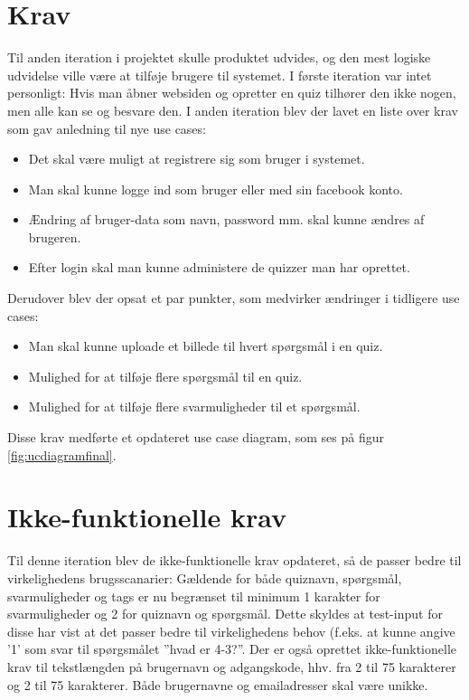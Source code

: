 \section{Krav}
Til anden iteration i projektet skulle produktet udvides, og den mest logiske udvidelse ville være at tilføje brugere til systemet. I første iteration var intet personligt: Hvis man åbner websiden og opretter en quiz tilhører den ikke nogen, men alle kan se og besvare den.
I anden iteration blev der lavet en liste over krav som gav anledning til nye use cases:
\begin{itemize}
\item Det skal være muligt at registrere sig som bruger i systemet.
\item Man skal kunne logge ind som bruger eller med sin facebook konto.
\item Ændring af bruger-data som navn, password mm. skal kunne ændres af brugeren.
\item Efter login skal man kunne administere de quizzer man har oprettet.
\end{itemize}

Derudover blev der opsat et par punkter, som medvirker ændringer i tidligere use cases:
\begin{itemize}
\item Man skal kunne uploade et billede til hvert spørgsmål i en quiz.
\item Mulighed for at tilføje flere spørgsmål til en quiz.
\item Mulighed for at tilføje flere svarmuligheder til et spørgsmål.
\end{itemize}

Disse krav medførte et opdateret use case diagram, som ses på figur \ref{fig:ucdiagramfinal}.



\section{Ikke-funktionelle krav}
Til denne iteration blev de ikke-funktionelle krav opdateret, så de passer bedre til virkelighedens brugsscanarier:
Gældende for både quiznavn, spørgsmål, svarmuligheder og tags er nu begrænset til minimum 1 karakter for svarmuligheder og 2 for quiznavn og spørgsmål. Dette skyldes at test-input for disse har vist at det passer bedre til virkelighedens behov (f.eks. at kunne angive '1' som svar til spørgsmålet ''hvad er 4-3?''.
Der er også oprettet ikke-funktionelle krav til tekstlængden på brugernavn og adgangskode, hhv. fra 2 til 75 karakterer og 2 til 75 karakterer. 
Både brugernavne og emailadresser skal være unikke.
